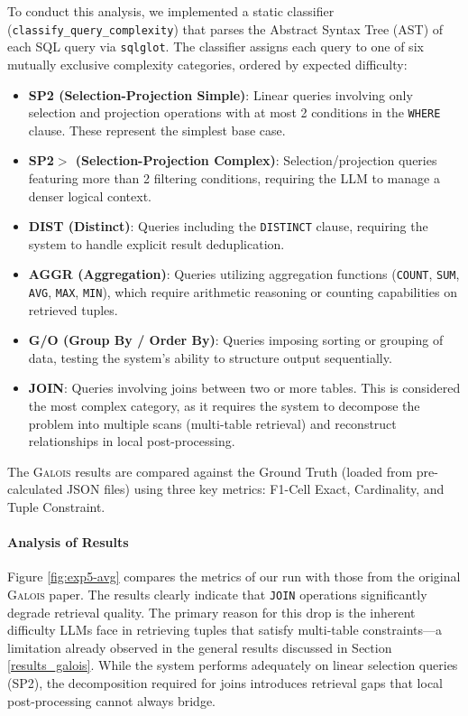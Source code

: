 To conduct this analysis, we implemented a static classifier (\texttt{classify\_query\_complexity}) that parses the Abstract Syntax Tree (AST) of each SQL query via \texttt{sqlglot}. The classifier assigns each query to one of six mutually exclusive complexity categories, ordered by expected difficulty:

\begin{itemize}[leftmargin=*, noitemsep]
    \item \textbf{SP2 (Selection-Projection Simple)}: Linear queries involving only selection and projection operations with at most 2 conditions in the \texttt{WHERE} clause. These represent the simplest base case.
    \item \textbf{SP2$>$ (Selection-Projection Complex)}: Selection/projection queries featuring more than 2 filtering conditions, requiring the LLM to manage a denser logical context.
    \item \textbf{DIST (Distinct)}: Queries including the \texttt{DISTINCT} clause, requiring the system to handle explicit result deduplication.
    \item \textbf{AGGR (Aggregation)}: Queries utilizing aggregation functions (\texttt{COUNT}, \texttt{SUM}, \texttt{AVG}, \texttt{MAX}, \texttt{MIN}), which require arithmetic reasoning or counting capabilities on retrieved tuples.
    \item \textbf{G/O (Group By / Order By)}: Queries imposing sorting or grouping of data, testing the system's ability to structure output sequentially.
    \item \textbf{JOIN}: Queries involving joins between two or more tables. This is considered the most complex category, as it requires the system to decompose the problem into multiple scans (multi-table retrieval) and reconstruct relationships in local post-processing.
\end{itemize}

The \textsc{Galois} results are compared against the Ground Truth (loaded from pre-calculated JSON files) using three key metrics: F1-Cell Exact, Cardinality, and Tuple Constraint.

\paragraph{Analysis of Results}
Figure \ref{fig:exp5-avg} compares the metrics of our run with those from the original \textsc{Galois} paper. The results clearly indicate that \texttt{JOIN} operations significantly degrade retrieval quality. The primary reason for this drop is the inherent difficulty LLMs face in retrieving tuples that satisfy multi-table constraints—a limitation already observed in the general results discussed in Section \ref{results_galois}. While the system performs adequately on linear selection queries (SP2), the decomposition required for joins introduces retrieval gaps that local post-processing cannot always bridge.

